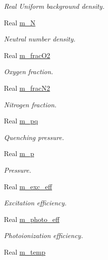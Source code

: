 \begin{DoxyCompactItemize}
\begin{DoxyCompactList}\small\item\em Real Uniform background density. \end{DoxyCompactList}\item 
Real \hyperlink{classmorrow__lowke_a89109e1a83cda4eab5d4505e9f043d2c}{m\+\_\+N}
\begin{DoxyCompactList}\small\item\em Neutral number density. \end{DoxyCompactList}\item 
Real \hyperlink{classmorrow__lowke_ac8f7aec7cad8720dbdca3840adf769ae}{m\+\_\+frac\+O2}
\begin{DoxyCompactList}\small\item\em Oxygen fraction. \end{DoxyCompactList}\item 
Real \hyperlink{classmorrow__lowke_ad58c00d8a80d4fc657e94470114b7969}{m\+\_\+frac\+N2}
\begin{DoxyCompactList}\small\item\em Nitrogen fraction. \end{DoxyCompactList}\item 
Real \hyperlink{classmorrow__lowke_a84d13ef230b19cc931381aa43d93eac3}{m\+\_\+pq}
\begin{DoxyCompactList}\small\item\em Quenching pressure. \end{DoxyCompactList}\item 
Real \hyperlink{classmorrow__lowke_a70a4c695e003ff81a161a81118f32fd6}{m\+\_\+p}
\begin{DoxyCompactList}\small\item\em Pressure. \end{DoxyCompactList}\item 
Real \hyperlink{classmorrow__lowke_ae680421e16733ea1748459eb70b50d36}{m\+\_\+exc\+\_\+eff}
\begin{DoxyCompactList}\small\item\em Excitation efficiency. \end{DoxyCompactList}\item 
Real \hyperlink{classmorrow__lowke_a7f59aae10b05a048b30d26ccfbfa4f11}{m\+\_\+photo\+\_\+eff}
\begin{DoxyCompactList}\small\item\em Photoionization efficiency. \end{DoxyCompactList}\item 
Real \hyperlink{classmorrow__lowke_ad2afd8205b3c323cb17427016a802186}{m\+\_\+temp}

\end{DoxyCompactItemize}

